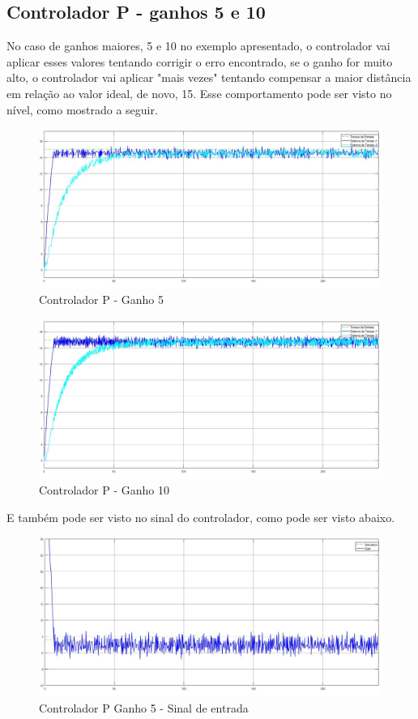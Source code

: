 \documentclass[
	12pt,				%
	openany,			%
	oneside,			%
	a4paper,			%
	english,			%
	french,				%
	spanish,			%
	brazil,				%
	]{abntex2}
\begin{document}
{\subsection{Controlador P - ganhos 5 e 10}

No caso de ganhos maiores, 5 e 10 no exemplo apresentado, o controlador vai aplicar esses valores tentando corrigir o erro encontrado, se o ganho for muito alto, o controlador vai aplicar "mais vezes" tentando compensar a maior distância em relação ao valor ideal, de novo, 15. Esse comportamento pode ser visto no nível, como mostrado a seguir.

\begin{figure}[h]
	\centering
	\includegraphics[scale=0.30]{controlador_p_ganho_5.jpg}
	\caption{Controlador P - Ganho 5}
\end{figure}

\begin{figure}[h]
	\centering
	\includegraphics[scale=0.30]{controlador_p_ganho_10.jpg}
	\caption{Controlador P - Ganho 10}
\end{figure}

E também pode ser visto no sinal do controlador, como pode ser visto abaixo.

\begin{figure}[h]
	\centering
	\includegraphics[scale=0.33]{osciloscopio_ganho_5.jpg}
	\caption{Controlador P Ganho 5 - Sinal de entrada}
	\label{fig:controladorPG5}
\end{figure}

}
\end{document}
